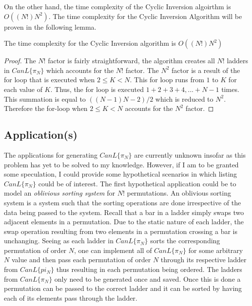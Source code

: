     On the other hand, the time complexity of the Cyclic Inversion algoirthm is $O((N!)N^{2})$. The time complexity for the Cyclic 
    Inversion Algorithm will be proven in the following lemma.

    \begin{lemma}
        The time complexity for the Cyclic Inversion algorithm is $O((N!)N^{2})$
    \end{lemma}
    \begin{proof}
        The $N!$ factor is fairly straightforward, the algorithm creates all $N!$ ladders in $CanL\{\pi_{N}\}$ which accounts 
        for the $N!$ factor. The $N^{2}$ factor is a result of the for loop that is executed when $2 \leq K < N$. This for loop runs 
        from $1$ to $K$ for each value of $K$. Thus, the for loop is executed $1 + 2 + 3 + 4, ... + N-1$ times. This summation 
        is equal to $((N-1)N-2)/2$ which is reduced to $N^{2}$. Therefore the for-loop when $2 \leq K < N$ accounts for the $N^{2}$
        factor.
    \end{proof}

    \subsection{Application(s)}
    The applications for generating $CanL\{\pi_{N}\}$ are currently unknown insofar as this problem has yet to be solved to my knowledge. 
    However, if I am to be granted some speculation, I could provide some hypothetical scenarios in which listing $CanL\{\pi_{N}\}$ could 
    be of interest. The first hypothetical application could be to model an \emph{oblivious sorting system} for $N!$ permutations. An oblivious 
    sorting system is a system such that the sorting operations are done irrespective of the data being passed to the system. Recall 
    that a bar in a ladder simply swaps two adjacent elements in a permutation. Due to the static nature of each ladder, the swap operation 
    resulting from two elements in a permutation crossing a bar is unchanging. 
    Seeing as each ladder in $CanL\{\pi_{N}\}$ sorts the corresponding permutation of order $N$, one can implement all of $CanL\{\pi_{N}\}$ 
    for some arbitrary $N$ value and then pass each permutation of order $N$ through its respective ladder from $CanL\{pi_{N}\}$ thus 
    resulting in each permutation being ordered. The ladders from $CanL\{\pi_{N}\}$ only need to be generated once and saved. Once this is done 
    a permutation can be passed to the correct ladder and it can be sorted by having each of its elements pass through the ladder. 